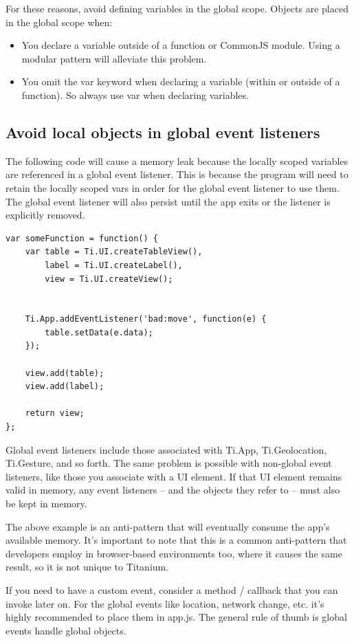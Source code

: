 \documentclass[11pt]{book}
\begin{document}
For these reasons, avoid defining variables in the global scope. Objects are placed in the global scope when:
\begin{itemize}
	\item You declare a variable outside of a function or CommonJS module. Using a modular pattern will alleviate this problem.
	\item You omit the var keyword when declaring a variable (within or outside of a function). So always use var when declaring variables.
\end{itemize}

\subsection{Avoid local objects in global event listeners}
The following code will cause a memory leak because the locally scoped variables are referenced in a global event listener. This is because the program will need to retain the locally scoped vars in order for the global event listener to use them. The global event listener will also persist until the app exits or the listener is explicitly removed.

\begin{lstlisting}[frame=single]
var someFunction = function() {
    var table = Ti.UI.createTableView(),
        label = Ti.UI.createLabel(),
        view = Ti.UI.createView();


    Ti.App.addEventListener('bad:move', function(e) {
        table.setData(e.data);
    });

    view.add(table);
    view.add(label);

    return view;
};
\end{lstlisting}

Global event listeners include those associated with Ti.App, Ti.Geolocation, Ti.Gesture, and so forth. The same problem is possible with non-global event listeners, like those you associate with a UI element. If that UI element remains valid in memory, any event listeners – and the objects they refer to – must also be kept in memory.

The above example is an anti-pattern that will eventually consume the app's available memory. It's important to note that this is a common anti-pattern that developers employ in browser-based environments too, where it causes the same result, so it is not unique to Titanium.

If you need to have a custom event, consider a method / callback that you can invoke later on. For the global events like location, network change, etc. it's highly recommended to place them in app.js. The general rule of thumb is global events handle global objects.
\end{document}
